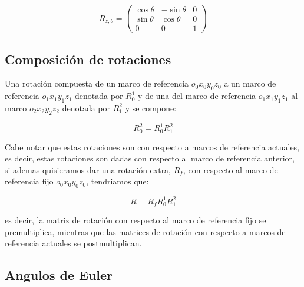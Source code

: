 \begin{multicols*}{2}
            \begin{equation}
                R_{z, \theta} =
                \begin{pmatrix}
                    \cos{\theta} & -\sin{\theta} & 0 \\
                    \sin{\theta} & \cos{\theta} & 0 \\
                    0 & 0 & 1
                \end{pmatrix}
            \end{equation}


        \subsection{Composición de rotaciones}

            Una rotación compuesta de un marco de referencia $o_0 x_0 y_0 z_0$ a un marco de referencia $o_1 x_1 y_1 z_1$ denotada por $R_0^1$ y de una del marco de referencia $o_1 x_1 y_1 z_1$ al marco $o_2 x_2 y_2 z_2$ denotada por $R_1^2$ y se compone:

            \begin{equation}
                R_0^2 = R_0^1 R_1^2
            \end{equation}

            Cabe notar que estas rotaciones son con respecto a marcos de referencia actuales, es decir, estas rotaciones son dadas con respecto al marco de referencia anterior, si ademas quisieramos dar una rotación extra, $R_f$, con respecto al marco de referencia fijo $o_0 x_0 y_0 z_0$, tendriamos que:

            \begin{equation}
                R = R_f R_0^1 R_1^2
            \end{equation}

            es decir, la matriz de rotación con respecto al marco de referencia fijo se premultiplica, mientras que las matrices de rotación con respecto a marcos de referencia actuales se postmultiplican.


        \subsection{Angulos de Euler}


\end{multicols*}
